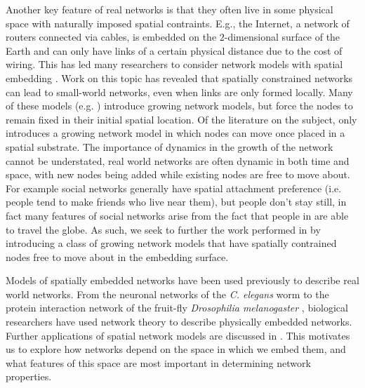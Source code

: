 \documentclass[aps,pre,manuscript,superscriptaddress,amsmath,amssymb,nofootinbib]{revtex4-1}
\begin{document}
Another key feature of real networks is that they often live in some physical space with naturally imposed spatial contraints. 
E.g., the Internet, a network of routers connected via cables, is embedded on the $2$-dimensional surface of the Earth and can only have links of a certain physical distance due to the cost of wiring.
This has led many researchers to consider network models with spatial embedding \cite{ozik2004,przuljgeo,hermannspace,bullockspatial,guan1D,zhang2006,zhang2007}.
Work on this topic has revealed that spatially constrained networks can lead to small-world networks, even when links are only formed locally.
Many of these models (e.g. \cite{bullockspatial,guan1D,przuljgeo}) introduce growing network models, but force the nodes to remain fixed in their initial spatial location.
Of the literature on the subject, only \cite{ozik2004} introduces a growing network model in which nodes can move once placed in a spatial substrate.
The importance of dynamics in the growth of the network cannot be understated, real world networks are often dynamic in both time and space, with new nodes being added while existing nodes are free to move about.
For example social networks generally have spatial attachment preference (i.e. people tend to make friends who live near them), but people don't stay still, in fact many features of social networks arise from the fact that people in are able to travel the globe. 
As such, we seek to further the work performed in \cite{ozik2004} by introducing a class of growing network models that have spatially contrained nodes free to move about in the embedding surface. 

Models of spatially embedded networks have been used previously to describe real world networks.
From the neuronal networks of the \textit{C. elegans} worm \cite{plenzcascade} to the protein interaction network of the fruit-fly \textit{Drosophilia melanogaster} \cite{fruitfly}, biological researchers have used network theory to describe physically embedded networks.
Further applications of spatial network models are discussed in \cite{neuronembedding,barthelemy,vazquez2002}.
This motivates us to explore how networks depend on the space in which we embed them, and what features of this space are most important in determining network properties.
\end{document}

